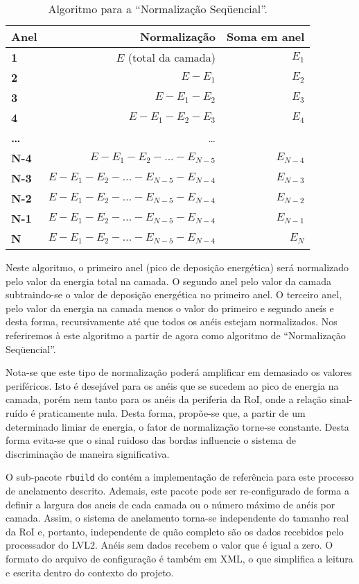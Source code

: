 \begin{table}
\renewcommand{\baselinestretch}{1.5}
\caption{Algoritmo para a ``Normalização Seqüencial''.}
\label{tab:seq}
\renewcommand{\baselinestretch}{1}
\begin{center}
\begin{tabular}{>{\bfseries}l r r}
Anel & Normalização & Soma em anel \\ \hline
1 & $E$ (total da camada) & $E_1$\\
2 & $E - E_1$ & $E_2$ \\
3 & $E - E_1 - E_2$ & $E_3$\\
4 & $E - E_1 - E_2 - E_3$ & $E_4$\\
\dots  & \dots \\
N-4 & $E - E_1 - E_2 - ... - E_{N-5}$ & $E_{N-4}$ \\
N-3 & $E - E_1 - E_2 - ... - E_{N-5} - E_{N-4}$ & $E_{N-3}$ \\
N-2 & $E - E_1 - E_2 - ... - E_{N-5} - E_{N-4}$ & $E_{N-2}$ \\
N-1 & $E - E_1 - E_2 - ... - E_{N-5} - E_{N-4}$ & $E_{N-1}$ \\
N & $E - E_1 - E_2 - ... - E_{N-5} - E_{N-4}$ & $E_N$ \\
\end{tabular}
\end{center}
\end{table}

Neste algoritmo, o primeiro anel (pico de deposição energética) será
normalizado pelo valor da energia total na camada. O segundo anel pelo valor
da camada subtraindo-se o valor de deposição energética no primeiro anel. O
terceiro anel, pelo valor da energia na camada menos o valor do primeiro e
segundo aneís e desta forma, recursivamente até que todos os anéis estejam
normalizados. Nos referiremos à este algoritmo a partir de agora como
algoritmo de ``Normalização Seqüencial''.

Nota-se que este tipo de normalização poderá amplificar em demasiado os
valores periféricos. Isto é desejável para os anéis que se sucedem ao pico de
energia na camada, porém nem tanto para os anéis da periferia da RoI, onde a
relação sinal-ruído é praticamente nula. Desta forma, propõe-se que, a partir
de um determinado limiar de energia, o fator de normalização torne-se
constante. Desta forma evita-se que o sinal ruidoso das bordas influencie o
sistema de discriminação de maneira significativa.

O sub-pacote \texttt{rbuild} do  contém a implementação de
referência para este processo de anelamento descrito. Ademais, este pacote
pode ser re-configurado de forma a definir a largura dos aneis de cada camada
ou o número máximo de anéis por camada. Assim, o sistema de anelamento torna-se
independente do tamanho real da RoI e, portanto, independente de quão completo
são os dados recebidos pelo processador do LVL2. Anéis sem dados recebem o
valor  que é igual a zero. O formato do arquivo de configuração é
também em XML, o que simplifica a leitura e escrita dentro do contexto do
projeto.

